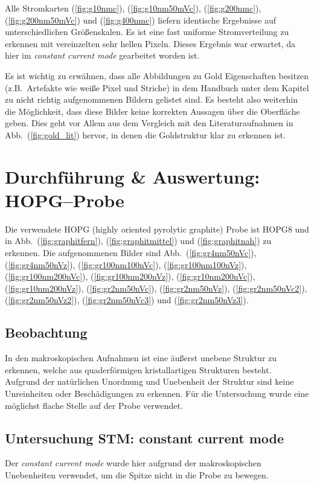 \documentclass[sn-mathphys-num,iicol]{sn-jnl}
\theoremstyle{thmstyleone}
\theoremstyle{thmstyletwo}
\theoremstyle{thmstylethree}
\begin{document}
Alle Stromkarten (\ref{fig:g10nmc}), (\ref{fig:g10nm50mVc}), (\ref{fig:g200nmc}), (\ref{fig:g200nm50mVc}) und (\ref{fig:g400nmc}) liefern identische Ergebnisse auf unterschiedlichen Größenskalen.
Es ist eine fast uniforme Stromverteilung zu erkennen mit vereinzelten sehr hellen Pixeln.
Dieses Ergebnis war erwartet, da hier im \textit{constant current mode} gearbeitet worden ist.

Es ist wichtig zu erwähnen, dass alle Abbildungen zu Gold Eigenschaften besitzen (z.B.\ Artefakte wie weiße Pixel und Striche) in dem Handbuch unter dem Kapitel zu nicht richtig aufgenommenen Bildern gelistet sind.
Es besteht also weiterhin die Möglichkeit, dass diese Bilder keine korrekten Aussagen über die Oberfläche geben.
Dies geht vor Allem aus dem Vergleich mit den Literaturaufnahmen in Abb.\ (\ref{fig:gold_lit}) hervor, in denen die Goldstruktur klar zu erkennen ist.

\section{Durchführung \& Auswertung:\\HOPG--Probe}
Die verwendete HOPG (highly oriented pyrolytic graphite) Probe ist \glqq HOPG8\grqq{} und in Abb.\ (\ref{fig:graphitfern}), (\ref{fig:graphitmittel}) und (\ref{fig:graphitnah}) zu erkennen.
Die aufgenommenen Bilder sind Abb.\ (\ref{fig:gr4nm50nVc}), (\ref{fig:gr4nm50nVz}), (\ref{fig:gr100nm100nVc}), (\ref{fig:gr100nm100nVz}), (\ref{fig:gr100nm200nVc}), (\ref{fig:gr100nm200nVz}), (\ref{fig:gr10nm200nVc}), (\ref{fig:gr10nm200nVz}), (\ref{fig:gr2nm50nVc}), (\ref{fig:gr2nm50nVz}), (\ref{fig:gr2nm50nVc2}), (\ref{fig:gr2nm50nVz2}), (\ref{fig:gr2nm50nVc3}) und (\ref{fig:gr2nm50nVz3}).

\subsection{Beobachtung}
In den makroskopischen Aufnahmen ist eine äußerst unebene Struktur zu erkennen, welche aus quaderförmigen kristallartigen Strukturen besteht. %
Aufgrund der natürlichen Unordnung und Unebenheit der Struktur sind keine Unreinheiten oder Beschädigungen zu erkennen.
Für die Untersuchung wurde eine möglichst flache Stelle auf der Probe verwendet.

\subsection{Untersuchung STM: constant current mode}
Der \textit{constant current mode} wurde hier aufgrund der makroskopischen Unebenheiten verwendet, um die Spitze nicht in die Probe zu bewegen.
\end{document}
